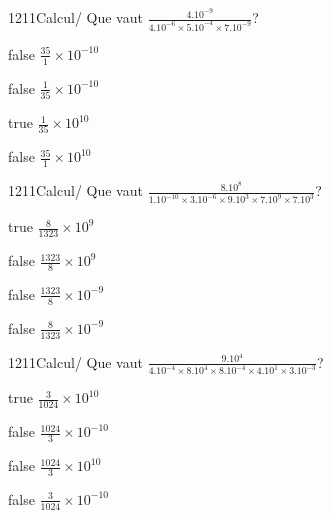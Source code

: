 \documentclass[11pt]{article}
\begin{document}
            \begin{question}{1211}{Calcul}{}{/}
                Que vaut $\frac{4.10^{-9}}{4.10^{-6}\times 5.10^{-4}\times 7.10^{-9}}$?
            \end{question}
            
            \begin{reponses}
                \item[false] $\frac{35}{1}\times 10^{-10}$
                \item[false] $\frac{1}{35}\times 10^{-10}$
                \item[true] $\frac{1}{35}\times 10^{10}$
                \item[false] $\frac{35}{1}\times 10^{10}$
            \end{reponses}
            
            \begin{question}{1211}{Calcul}{}{/}
                Que vaut $\frac{8.10^{8}}{1.10^{-10}\times 3.10^{-6}\times 9.10^{3}\times 7.10^{9}\times 7.10^{3}}$?
            \end{question}
            
            \begin{reponses}
                \item[true] $\frac{8}{1323}\times 10^{9}$
                \item[false] $\frac{1323}{8}\times 10^{9}$
                \item[false] $\frac{1323}{8}\times 10^{-9}$
                \item[false] $\frac{8}{1323}\times 10^{-9}$
            \end{reponses}
            
            \begin{question}{1211}{Calcul}{}{/}
                Que vaut $\frac{9.10^{4}}{4.10^{-4}\times 8.10^{4}\times 8.10^{-4}\times 4.10^{1}\times 3.10^{-3}}$?
            \end{question}
            
            \begin{reponses}
                \item[true] $\frac{3}{1024}\times 10^{10}$
                \item[false] $\frac{1024}{3}\times 10^{-10}$
                \item[false] $\frac{1024}{3}\times 10^{10}$
                \item[false] $\frac{3}{1024}\times 10^{-10}$
            \end{reponses}
            
\end{document}
